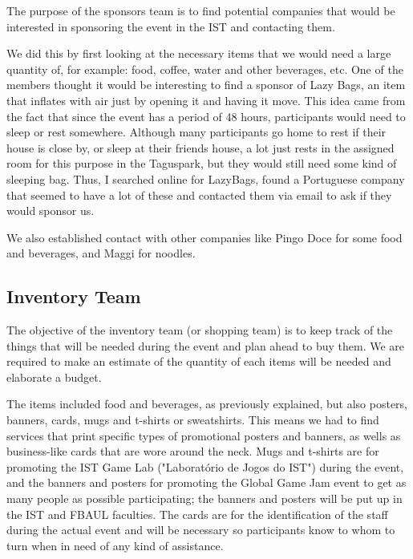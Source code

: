 \documentclass[a4paper,12pt,journal,twoside,compsoc]{PPIEEEtran}
\begin{document}
The purpose of the sponsors team is to find potential companies that would be interested in sponsoring the event in the IST and contacting them. 

We did this by first looking at the necessary items that we would need a large quantity of, for example: food, coffee, water and other beverages, etc. One of the members thought it would be interesting to find a sponsor of Lazy Bags, an item that inflates with air just by opening it and having it move. This idea came from the fact that since the event has a period of 48 hours, participants would need to sleep or rest somewhere. Although many participants go home to rest if their house is close by, or sleep at their friends house, a lot just rests in the assigned room for this purpose in the Taguspark, but they would still need some kind of sleeping bag. Thus, I searched online for LazyBags, found a Portuguese company that seemed to have a lot of these and contacted them via email to ask if they would sponsor us.

We also established contact with other companies like Pingo Doce for some food and beverages, and Maggi for noodles.

\subsection{Inventory Team}

The objective of the inventory team (or shopping team) is to keep track of the things that will be needed during the event and plan ahead to buy them. We are required to make an estimate of the quantity of each items will be needed and elaborate a budget. 

The items included food and beverages, as previously explained, but also posters, banners, cards, mugs and t-shirts or sweatshirts. This means we had to find services that print specific types of promotional posters and banners, as wells as business-like cards that are wore around the neck. Mugs and t-shirts are for promoting the IST Game Lab ("Laboratório de Jogos do IST") during the event, and the banners and posters for promoting the Global Game Jam event to get as many people as possible participating; the banners and posters will be put up in the IST and FBAUL faculties. The cards are for the identification of the staff during the actual event and will be necessary so participants know to whom to turn when in need of any kind of assistance.
\end{document}
